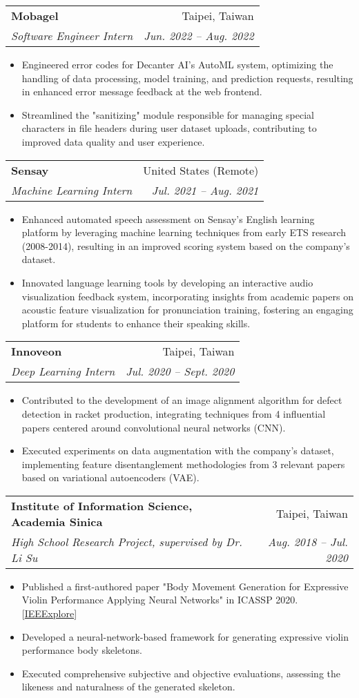 \documentclass[letterpaper,11pt]{article}
\makeatletter
\newcommand{\resumeItem}[1]{
  \item\small{#1}
}
\newcommand{\resumeSubheading}[4]{
  \vspace{-1pt}\item
    \begin{tabular*}{0.97\textwidth}[t]{l@{\extracolsep{\fill}}r}
      \textbf{#1} & #2 \\
      \textit{\small#3} & \textit{\small #4} \\
    \end{tabular*}\vspace{-5pt}
}
\newcommand{\resumeItemListStart}{\begin{itemize}}
\newcommand{\resumeItemListEnd}{\end{itemize}\vspace{-5pt}}
\makeatother
\begin{document}
    \resumeSubheading
      {Mobagel}{Taipei, Taiwan}
      {Software Engineer Intern}{Jun. 2022 -- Aug. 2022}
      \resumeItemListStart
        \resumeItem{}{Engineered error codes for Decanter AI's AutoML system, optimizing the handling of data processing, model training, and prediction requests, resulting in enhanced error message feedback at the web frontend.}
        \resumeItem{}{Streamlined the "sanitizing" module responsible for managing special characters in file headers during user dataset uploads, contributing to improved data quality and user experience.}
      \resumeItemListEnd

    \resumeSubheading
      {Sensay}{United States (Remote)}
      {Machine Learning Intern}{Jul. 2021 -- Aug. 2021}
      \resumeItemListStart
        \resumeItem{}{Enhanced automated speech assessment on Sensay's English learning platform by leveraging machine learning techniques from early ETS research (2008-2014), resulting in an improved scoring system based on the company's dataset.}
        \resumeItem{}{Innovated language learning tools by developing an interactive audio visualization feedback system, incorporating insights from academic papers on acoustic feature visualization for pronunciation training, fostering an engaging platform for students to enhance their speaking skills.}
      \resumeItemListEnd
    
      \resumeSubheading
        {Innoveon}{Taipei, Taiwan}
        {Deep Learning Intern}{Jul. 2020 -- Sept. 2020}
        \resumeItemListStart
          \resumeItem{}{Contributed to the development of an image alignment algorithm for defect detection in racket production, integrating techniques from 4 influential papers centered around convolutional neural networks (CNN).}
          \resumeItem{}{Executed experiments on data augmentation with the company's dataset, implementing feature disentanglement methodologies from 3 relevant papers based on variational autoencoders (VAE).}
        \resumeItemListEnd
      
        \resumeSubheading
          {Institute of Information Science, Academia Sinica}{Taipei, Taiwan}
          {High School Research Project, supervised by Dr. Li Su} {Aug. 2018 -- Jul. 2020}
          \resumeItemListStart
            \resumeItem{}{Published a first-authored paper "Body Movement Generation for Expressive Violin Performance Applying Neural Networks" in ICASSP 2020. [\href{https://ieeexplore.ieee.org/document/9054463}{IEEExplore}]}
            \resumeItem{}{Developed a neural-network-based framework for generating expressive violin performance body skeletons.}
            \resumeItem{}{Executed comprehensive subjective and objective evaluations, assessing the likeness and naturalness of the generated skeleton.}
          \resumeItemListEnd
          
\end{document}
